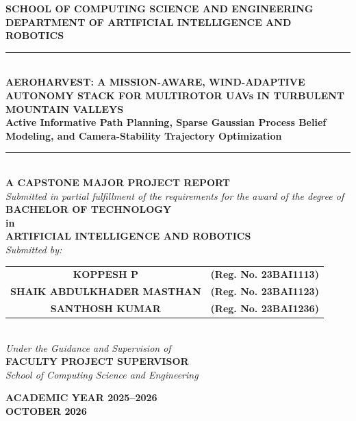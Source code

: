 \documentclass[12pt,a4paper,oneside]{report}
\begin{document}
\begin{titlepage}
    \begin{center}
        \vspace*{2mm}
        {\large \textbf{SCHOOL OF COMPUTING SCIENCE AND ENGINEERING}}\\[1mm]
        {\normalsize \textbf{DEPARTMENT OF ARTIFICIAL INTELLIGENCE AND ROBOTICS}}\\[10mm]
        
        \rule{\linewidth}{1.2pt}\\[6mm]
        {\Large \textbf{AEROHARVEST: A MISSION-AWARE, WIND-ADAPTIVE AUTONOMY STACK FOR MULTIROTOR UAVs IN TURBULENT MOUNTAIN VALLEYS}}\\[4mm]
        {\large \textbf{Active Informative Path Planning, Sparse Gaussian Process Belief Modeling, and Camera-Stability Trajectory Optimization}}\\[6mm]
        \rule{\linewidth}{1.2pt}\\[8mm]
        
        {\large \textbf{A CAPSTONE MAJOR PROJECT REPORT}}\\[3mm]
        {\normalsize \textit{Submitted in partial fulfillment of the requirements for the award of the degree of}}\\[4mm]
        {\Large \textbf{BACHELOR OF TECHNOLOGY}}\\[2mm]
        {\large \textbf{in}}\\[2mm]
        {\Large \textbf{ARTIFICIAL INTELLIGENCE AND ROBOTICS}}\\[10mm]
        
        \textit{Submitted by:}\\[3mm]
        \begin{tabular}{cc}
            \textbf{KOPPESH P} & \textbf{(Reg. No. 23BAI1113)} \\
            \textbf{SHAIK ABDULKHADER MASTHAN} & \textbf{(Reg. No. 23BAI1123)} \\
            \textbf{SANTHOSH KUMAR} & \textbf{(Reg. No. 23BAI1236)}
        \end{tabular}\\[12mm]
        
        \textit{Under the Guidance and Supervision of}\\[3mm]
        \textbf{FACULTY PROJECT SUPERVISOR}\\[1mm]
        \textit{School of Computing Science and Engineering}\\[12mm]
        
        \vfill
        
        {\large \textbf{ACADEMIC YEAR 2025--2026}}\\[1mm]
        {\normalsize \textbf{OCTOBER 2026}}
    \end{center}
\end{titlepage}
\end{document}
